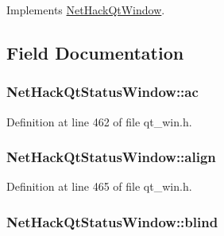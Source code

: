 Implements \hyperlink{classNetHackQtWindow_a454ce97ef84b9c19e4ec168472875c5b}{Net\+Hack\+Qt\+Window}.



\subsection{Field Documentation}
\hypertarget{classNetHackQtStatusWindow_a0168d915cc7e0cb9c577881f29852d15}{
\subsubsection[{ac}]{ Net\+Hack\+Qt\+Status\+Window\+::ac\hspace{0.3cm}{\ttfamily [private]}}}\label{classNetHackQtStatusWindow_a0168d915cc7e0cb9c577881f29852d15}


Definition at line 462 of file qt\+\_\+win.\+h.

\hypertarget{classNetHackQtStatusWindow_ae2b515da407d88bd8551c86a0247167b}{
\subsubsection[{align}]{ Net\+Hack\+Qt\+Status\+Window\+::align\hspace{0.3cm}{\ttfamily [private]}}}\label{classNetHackQtStatusWindow_ae2b515da407d88bd8551c86a0247167b}


Definition at line 465 of file qt\+\_\+win.\+h.

\hypertarget{classNetHackQtStatusWindow_ab02035741f03c8c561ff6fbf3e204b47}{
\subsubsection[{blind}]{ Net\+Hack\+Qt\+Status\+Window\+::blind\hspace{0.3cm}{\ttfamily [private]}}}\label{classNetHackQtStatusWindow_ab02035741f03c8c561ff6fbf3e204b47}



